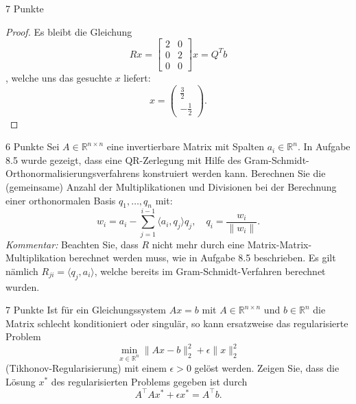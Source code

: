 \documentclass{problemset}
\begin{document}
\begin{problem}{7 Punkte}
\begin{proof}
    Es bleibt die Gleichung
    \begin{equation*}
        R x = \begin{bmatrix}
            2 & 0 \\
            0 & 2 \\
            0 & 0
        \end{bmatrix} x = Q^T b
    \end{equation*},
    welche uns das gesuchte \( x \) liefert:
    \begin{equation*}
        x = \begin{pmatrix}
            \frac{3}{2} \\ -\frac{1}{2}
        \end{pmatrix}.
    \end{equation*}
\end{proof}
\end{problem}

\begin{problem}{6 Punkte}
Sei \( A \in \mathbb{R}^{n \times n} \) eine invertierbare Matrix mit Spalten
\( a_i \in \mathbb{R}^n \). In Aufgabe 8.5 wurde gezeigt, dass eine
QR-Zerlegung mit Hilfe des Gram-Schmidt-Orthonormalisierungsverfahrens
konstruiert werden kann. Berechnen Sie die (gemeinsame) Anzahl der
Multiplikationen und Divisionen bei der Berechnung einer orthonormalen Basis \(
q_1, \ldots, q_n \) mit:
\[
    w_i = a_i - \sum_{j=1}^{i-1} \langle a_i, q_j \rangle q_j, \quad
    q_i = \frac{w_i}{\|w_i\|}.
\]
\textit{Kommentar:} Beachten Sie, dass \( R \) nicht mehr durch eine
Matrix-Matrix-Multiplikation berechnet werden muss, wie in Aufgabe 8.5
beschrieben. Es gilt nämlich \( R_{ji} = \langle q_j, a_i \rangle \), welche
bereits im Gram-Schmidt-Verfahren berechnet wurden.
\end{problem}

\begin{problem}{7 Punkte}
Ist für ein Gleichungssystem \( Ax = b \) mit \( A \in \mathbb{R}^{n \times n}
\) und \( b \in \mathbb{R}^n \) die Matrix schlecht konditioniert oder
singulär, so kann ersatzweise das regularisierte Problem
\[
    \min_{x \in \mathbb{R}^n} \|Ax - b\|_2^2 + \epsilon \|x\|_2^2
\]
(Tikhonov-Regularisierung) mit einem \( \epsilon > 0 \) gelöst werden. Zeigen
Sie, dass die Lösung \( x^* \) des regularisierten Problems gegeben ist durch
\[
    A^\top A x^* + \epsilon x^* = A^\top b.
\]
\end{problem}
\end{document}
